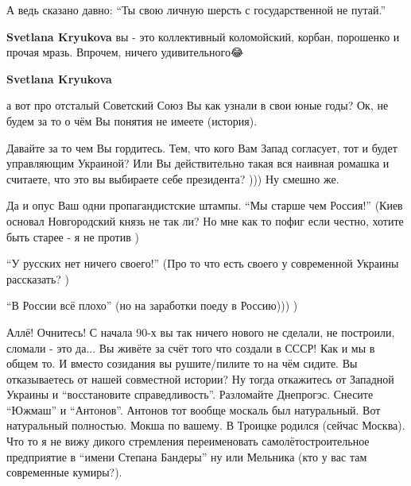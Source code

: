 \begin{itemize}
\begin{itemize}
А ведь сказано давно: \enquote{Ты свою личную шерсть с государственной не путай.}


 
\textbf{Svetlana Kryukova} вы - это коллективный коломойский, корбан, порошенко и прочая мразь. Впрочем, ничего удивительного😂

 
\textbf{Svetlana Kryukova} 

а вот про отсталый Советский Союз Вы как узнали в свои юные годы? Ок, не будем
за то о чём Вы понятия не имеете (история).

Давайте за то чем Вы гордитесь. Тем, что кого Вам Запад согласует, тот и будет
управляющим Украиной? Или Вы действительно такая вся наивная ромашка и
считаете, что это вы выбираете себе президента? ))) Ну смешно же.

Да и опус Ваш одни пропагандистские штампы. \enquote{Мы старше чем Россия!} (Киев
основал Новгородский князь не так ли? Но мне как то пофиг если честно, хотите
быть старее - я не против \Smiley[1.0][yellow])

\enquote{У русских нет ничего своего!} (Про то что есть своего у современной Украины
рассказать? \Smiley[1.0][yellow])

\enquote{В России всё плохо} (но на заработки поеду в Россию))) \Smiley[1.0][yellow] )

Аллё! Очнитесь! С начала 90-х вы так ничего нового не сделали, не построили,
сломали - это да... Вы живёте за счёт того что создали в СССР! Как и мы в общем
то. И вместо созидания вы рушите/пилите то на чём сидите. Вы отказываетесь от
нашей совместной истории? Ну тогда откажитесь от Западной Украины и
\enquote{восстановите справедливость}. Разломайте Днепрогэс. Снесите \enquote{Южмаш} и
\enquote{Антонов}. Антонов тот вообще москаль был натуральный. Вот натуральный
полностью. Мокша по вашему. В Троицке родился (сейчас Москва). Что то я не вижу
дикого стремления переименовать самолётостроительное предприятие в \enquote{имени
Степана Бандеры} ну или Мельника (кто у вас там современные кумиры?). 


\end{itemize}
\end{itemize}
